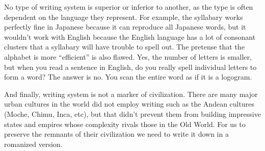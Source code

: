 No type of writing system is superior or inferior to another, as the type is often dependent on the language they represent. For example, the syllabary works perfectly fine in Japanese because it can reproduce all Japanese words, but it wouldn't work with English because the English language has a lot of consonant clusters that a syllabary will have trouble to spell out. The pretense that the alphabet is more \enquote{efficient} is also flawed. Yes, the number of letters is smaller, but when you read a sentence in English, do you really spell individual letters to form a word? The answer is no. You scan the entire word as if it is a logogram.

And finally, writing system is not a marker of civilization. There are many major urban cultures in the world did not employ writing such as the Andean cultures (Moche, Chimu, Inca, etc), but that didn't prevent them from building impressive states and empires whose complexity rivals those in the Old World. For us to preserve the remnants of their civilization we need to write it down in a romanized version.

